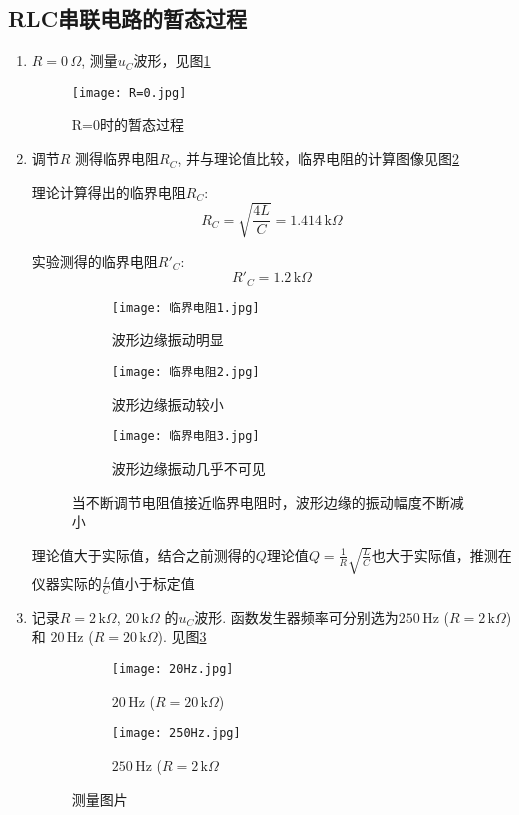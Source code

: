 \documentclass[11pt]{article}
\newcommand{\unit}[1]{\,\mathrm{#1}}
\newcommand{\cunit}[1]{\,#1} %
\begin{document}
\subsection{RLC串联电路的暂态过程}
\begin{enumerate}
	\item $R=0 \cunit{\Omega}$, 测量$u_C$波形，见图\ref{fig:R=0}
	\begin{figure}[htbp]
		\centering
		\texttt{[image: R=0.jpg]}
		\caption{R=0时的暂态过程}
		\label{fig:R=0}
	\end{figure}
	\item  调节$R$ 测得临界电阻$R_C$, 并与理论值比较，临界电阻的计算图像见图\ref{fig:临界电阻}
	
	理论计算得出的临界电阻$R_C$:
	\[
	R_C = \sqrt{\frac{4L}{C}}= 1.414\cunit{\mathrm{k}\Omega} 
	\]
	
	实验测得的临界电阻$R'_C$:
	\[
	R'_C = 1.2\cunit{\mathrm{k}\Omega} 
	\]
	\begin{figure}[htbp]
		\centering
		\begin{subfigure}{0.32\textwidth}
			\texttt{[image: 临界电阻1.jpg]}
			\caption{波形边缘振动明显}
		\end{subfigure}
		\begin{subfigure}{0.32\textwidth}
			\texttt{[image: 临界电阻2.jpg]}
			\caption{波形边缘振动较小}
		\end{subfigure}
		\begin{subfigure}{0.32\textwidth}
			\texttt{[image: 临界电阻3.jpg]}
			\caption{波形边缘振动几乎不可见}
		\end{subfigure}
		\caption{当不断调节电阻值接近临界电阻时，波形边缘的振动幅度不断减小}
		\label{fig:临界电阻}
	\end{figure}
	
	理论值大于实际值，结合之前测得的$Q$理论值$Q = \frac{1}{R} \sqrt{ \frac{L}{C} } $也大于实际值，推测在仪器实际的$\frac{L}{C}$值小于标定值
	\item 记录$R=2 \cunit{\mathrm{k}\Omega}$, $20 \cunit{\mathrm{k}\Omega}$ 的$u_C$波形. 函数发生器频率可分别选为$250 \unit{Hz}$ ($R=2 \cunit{\mathrm{k}\Omega}$) 和 $20 \unit{Hz}$ ($R=20 \cunit{\mathrm{k}\Omega}$). 见图\ref{fig:fuck}
	
	\begin{figure}[htbp]
	\centering
	\begin{subfigure}[t]{0.45\textwidth}  %
		\centering
		\texttt{[image: 20Hz.jpg]}  %
		\caption{$20 \unit{Hz}$ ($R=20 \cunit{\mathrm{k}\Omega}$)}
	\end{subfigure}
	\begin{subfigure}[t]{0.45\textwidth}  %
		\centering
		\texttt{[image: 250Hz.jpg]}  %
		\caption{$250 \unit{Hz}$ ($R=2 \cunit{\mathrm{k}\Omega}$}
	\end{subfigure}
	\caption{测量图片}
	\label{fig:fuck}
	\end{figure}
\end{enumerate}
\end{document}
